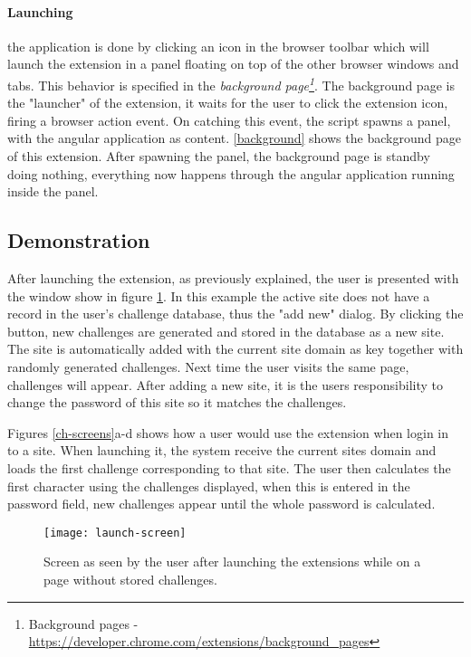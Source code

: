 \paragraph{Launching} the application is done by clicking an icon in the browser toolbar which will launch the extension in a panel floating on top of the other browser windows and tabs. This behavior is specified in the \emph{background page\footnote{Background pages - \url{https://developer.chrome.com/extensions/background_pages}}}. The background page is the "launcher" of the extension, it waits for the user to click the extension icon, firing a browser action event. On catching this event, the script spawns a panel, with the angular application as content. \autoref{background} shows the background page of this extension. After spawning the panel, the background page is standby doing nothing, everything now happens through the angular application running inside the panel. 



\subsection{Demonstration}\label{demo}
After launching the extension, as previously explained, the user is presented with the window show in figure \ref{launch-screen}. In this example the active site does not have a record in the user's challenge database, thus the "add new" dialog. By clicking the button, new challenges are generated and stored in the database as a new site. The site is automatically added with the current site domain as key together with randomly generated challenges. Next time the user visits the same page, challenges will appear. After adding a new site, it is the users responsibility to change the password of this site so it matches the challenges.

\par Figures \ref{ch-screens}a-d shows how a user would use the extension when login in to a site. When launching it, the system receive the current sites domain and loads the first challenge corresponding to that site. The user then calculates the first character using the challenges displayed, when this is entered in the password field, new challenges appear until the whole password is calculated. 

\begin{figure}
    \centering
    \texttt{[image: launch-screen]} 
    \caption{Screen as seen by the user after launching the extensions while on a page without stored challenges.}
    \label{launch-screen}
\end{figure}

